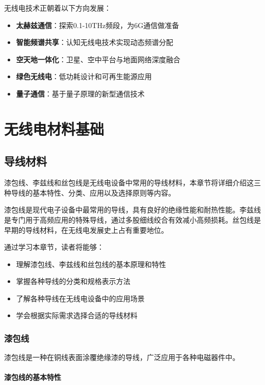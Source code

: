 \documentclass[12pt,UTF8]{ctexbook}
\begin{document}
无线电技术正朝着以下方向发展：

\begin{itemize}[leftmargin=3.5em]
    \item \textbf{太赫兹通信}：探索0.1-10THz频段，为6G通信做准备
    \item \textbf{智能频谱共享}：认知无线电技术实现动态频谱分配
    \item \textbf{空天地一体化}：卫星、空中平台与地面网络深度融合
    \item \textbf{绿色无线电}：低功耗设计和可再生能源应用
    \item \textbf{量子通信}：基于量子原理的新型通信技术
\end{itemize}

\part{无线电材料基础}

\chapter{导线材料}

漆包线、李兹线和丝包线是无线电设备中常用的导线材料，本章节将详细介绍这三种导线的基本特性、分类、应用以及选择原则等内容。

漆包线是现代电子设备中最常用的导线，具有良好的绝缘性能和耐热性能。李兹线是专门用于高频应用的特殊导线，通过多股细线绞合有效减小高频损耗。丝包线是早期的导线材料，在无线电发展史上占有重要地位。

通过学习本章节，读者将能够：

\begin{itemize}[leftmargin=3.5em]
    \item 理解漆包线、李兹线和丝包线的基本原理和特性
    \item 掌握各种导线的分类和规格表示方法
    \item 了解各种导线在无线电设备中的应用场景
    \item 学会根据实际需求选择合适的导线材料
\end{itemize}

\section{漆包线}

漆包线是一种在铜线表面涂覆绝缘漆的导线，广泛应用于各种电磁器件中。

\subsection{漆包线的基本特性}
\end{document}
